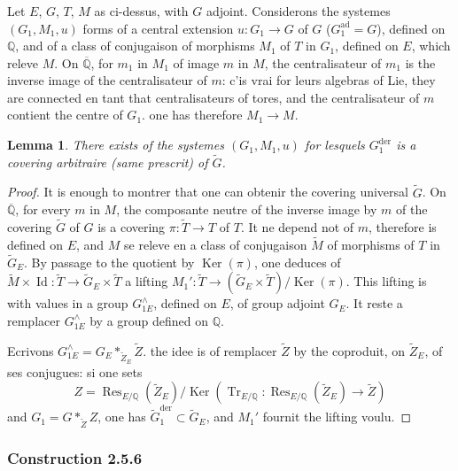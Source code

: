 \documentclass[12pt,a4paper]{article}
\theoremstyle{plain}
\newtheorem{lemma}[theorem]{Lemma}
\theoremstyle{definition}
\theoremstyle{remark}
\DeclareMathOperator{\Ker}{Ker}
\DeclareMathOperator{\Res}{Res}
\DeclareMathOperator{\Tr}{Tr}
\DeclareMathOperator{\Id}{Id}
\newcommand{\QQ}{\mathbb{Q}}
\begin{document}
\subsubsection{}

Let $E$, $G$, $T$, $M$ as ci-dessus, with $G$ adjoint. Considerons the systemes $(G_1,M_1,u)$ forms of a central extension $u:G_1 \to G$ of $G$ ($G_1^{\text{ad}} = G$), defined on $\QQ$, and of a class of conjugaison of morphisms $M_1$ of $T$ in $G_1$, defined on $E$, which releve $M$. On $\overline{\QQ}$, for $m_1$ in $M_1$ of image $m$ in $M$, the centralisateur of $m_1$ is the inverse image of the centralisateur of $m$: c'is vrai for leurs algebras of Lie, they are connected en tant that centralisateurs of tores, and the centralisateur of $m$ contient the centre of $G_1$. one has therefore $M_1 \to M$.

\begin{lemma}
There exists of the systemes $(G_1,M_1,u)$ for lesquels $G_1^{\text{der}}$ is a covering arbitraire (same prescrit) of $\tilde{G}$.
\end{lemma}

\begin{proof}
It is enough to montrer that one can obtenir the covering universal $\tilde{G}$. On $\overline{\QQ}$, for every $m$ in $M$, the composante neutre of the inverse image by $m$ of the covering $\tilde{G}$ of $G$ is a covering $\pi: \tilde{T} \to T$ of $T$. It ne depend not of $m$, therefore is defined on $E$, and $M$ se releve en a class of conjugaison $\tilde{M}$ of morphisms of $T$ in $\tilde{G}_E$. By passage to the quotient by $\Ker(\pi)$, one deduces of $\tilde{M} \times \Id: \tilde{T} \to \tilde{G}_E \times \tilde{T}$ a lifting $M_1': \tilde{T} \to (\tilde{G}_E \times \tilde{T})/\Ker(\pi)$. This lifting is with values in a group $G_{1E}^{\wedge}$, defined on $E$, of group adjoint $G_E$. It reste a remplacer $G_{1E}^{\wedge}$ by a group defined on $\QQ$.

Ecrivons $G_{1E}^{\wedge} = G_E *_{\tilde{Z}_E} \tilde{Z}$. the idee is of remplacer $\tilde{Z}$ by the coproduit, on $\tilde{Z}_E$, of ses conjugues: si one sets
\[
Z = \Res_{E/\QQ}(\tilde{Z}_E)/\Ker(\Tr_{E/\QQ}: \Res_{E/\QQ}(\tilde{Z}_E) \to \tilde{Z})
\]
and $G_1 = G *_{\tilde{Z}} Z$, one has $\tilde{G}_1^{\text{der}} \subset \tilde{G}_E$, and $M_1'$ fournit the lifting voulu.
\end{proof}

\subsubsection*{Construction 2.5.6}
\end{document}
